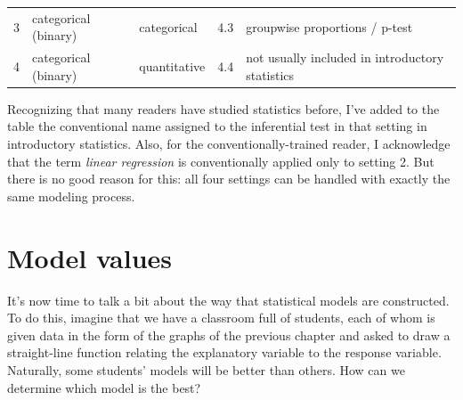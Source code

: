 \documentclass[]{tufte-book}
\begin{document}
\begin{longtable}[]{@{}lllll@{}}
\begin{minipage}[t]{0.03\columnwidth}\raggedright
3\strut
\end{minipage} & \begin{minipage}[t]{0.24\columnwidth}\raggedright
categorical (binary)\strut
\end{minipage} & \begin{minipage}[t]{0.29\columnwidth}\raggedright
categorical\strut
\end{minipage} & \begin{minipage}[t]{0.15\columnwidth}\raggedright
4.3\strut
\end{minipage} & \begin{minipage}[t]{0.14\columnwidth}\raggedright
groupwise proportions / p-test\strut
\end{minipage}\tabularnewline
\begin{minipage}[t]{0.03\columnwidth}\raggedright
4\strut
\end{minipage} & \begin{minipage}[t]{0.24\columnwidth}\raggedright
categorical (binary)\strut
\end{minipage} & \begin{minipage}[t]{0.29\columnwidth}\raggedright
quantitative\strut
\end{minipage} & \begin{minipage}[t]{0.15\columnwidth}\raggedright
4.4\strut
\end{minipage} & \begin{minipage}[t]{0.14\columnwidth}\raggedright
not usually included in introductory statistics\strut
\end{minipage}\tabularnewline
\bottomrule
\end{longtable}

Recognizing that many readers have studied statistics before, I've added to the table the conventional name assigned to the inferential test in that setting in introductory statistics. Also, for the conventionally-trained reader, I acknowledge that the term \emph{linear regression} is conventionally applied only to setting 2. But there is no good reason for this: all four settings can be handled with exactly the same modeling process.

\hypertarget{model-values}{%
\chapter{Model values}\label{model-values}}

It's now time to talk a bit about the way that statistical models are constructed. To do this, imagine that we have a classroom full of students, each of whom is given data in the form of the graphs of the previous chapter and asked to draw a straight-line function relating the explanatory variable to the response variable. Naturally, some students' models will be better than others. How can we determine which model is the best?
\end{document}
